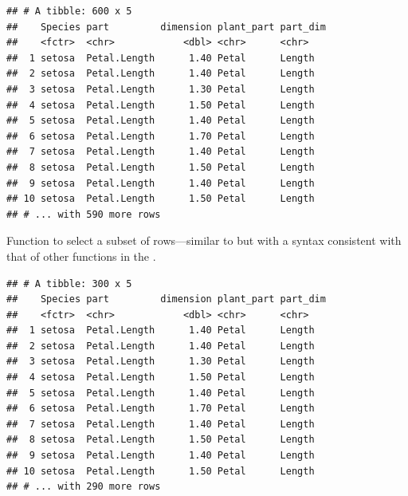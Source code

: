 \documentclass[krantz2,ChapterTOCs]{krantz}\usepackage{knitr}
\begin{document}
\begin{knitrout}\footnotesize
{}\color{fgcolor}\begin{kframe}
\begin{alltt}
\end{alltt}
\begin{verbatim}
## # A tibble: 600 x 5
##    Species part         dimension plant_part part_dim
##    <fctr>  <chr>            <dbl> <chr>      <chr>   
##  1 setosa  Petal.Length      1.40 Petal      Length  
##  2 setosa  Petal.Length      1.40 Petal      Length  
##  3 setosa  Petal.Length      1.30 Petal      Length  
##  4 setosa  Petal.Length      1.50 Petal      Length  
##  5 setosa  Petal.Length      1.40 Petal      Length  
##  6 setosa  Petal.Length      1.70 Petal      Length  
##  7 setosa  Petal.Length      1.40 Petal      Length  
##  8 setosa  Petal.Length      1.50 Petal      Length  
##  9 setosa  Petal.Length      1.40 Petal      Length  
## 10 setosa  Petal.Length      1.50 Petal      Length  
## # ... with 590 more rows
\end{verbatim}
\end{kframe}
\end{knitrout}

Function  to select a subset of rows---similar to  but with a syntax consistent with that of other functions in the .

\begin{knitrout}\footnotesize
{}\color{fgcolor}\begin{kframe}
\begin{alltt}
 \hlopt{==} \hlstd{)}
\end{alltt}
\begin{verbatim}
## # A tibble: 300 x 5
##    Species part         dimension plant_part part_dim
##    <fctr>  <chr>            <dbl> <chr>      <chr>   
##  1 setosa  Petal.Length      1.40 Petal      Length  
##  2 setosa  Petal.Length      1.40 Petal      Length  
##  3 setosa  Petal.Length      1.30 Petal      Length  
##  4 setosa  Petal.Length      1.50 Petal      Length  
##  5 setosa  Petal.Length      1.40 Petal      Length  
##  6 setosa  Petal.Length      1.70 Petal      Length  
##  7 setosa  Petal.Length      1.40 Petal      Length  
##  8 setosa  Petal.Length      1.50 Petal      Length  
##  9 setosa  Petal.Length      1.40 Petal      Length  
## 10 setosa  Petal.Length      1.50 Petal      Length  
## # ... with 290 more rows
\end{verbatim}
\end{kframe}
\end{knitrout}
\end{document}
